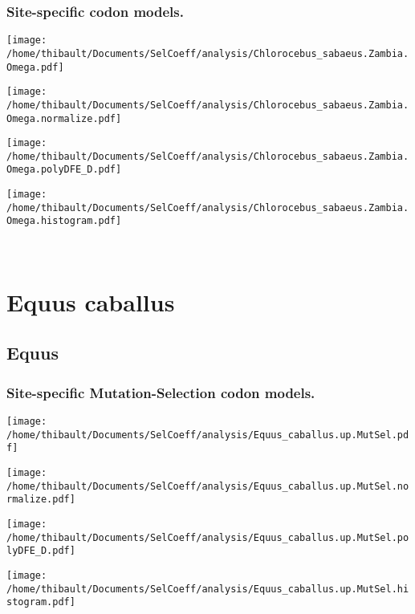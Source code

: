\subsubsection*{Site-specific codon models.} 
\begin{minipage}{0.49\linewidth} 
\texttt{[image: /home/thibault/Documents/SelCoeff/analysis/Chlorocebus\_sabaeus.Zambia.Omega.pdf]} 
\end{minipage}
\begin{minipage}{0.49\linewidth} 
\texttt{[image: /home/thibault/Documents/SelCoeff/analysis/Chlorocebus\_sabaeus.Zambia.Omega.normalize.pdf]} 
\end{minipage}
\begin{minipage}{0.49\linewidth} 
\texttt{[image: /home/thibault/Documents/SelCoeff/analysis/Chlorocebus\_sabaeus.Zambia.Omega.polyDFE\_D.pdf]} 
\end{minipage}
\begin{minipage}{0.49\linewidth} 
\texttt{[image: /home/thibault/Documents/SelCoeff/analysis/Chlorocebus\_sabaeus.Zambia.Omega.histogram.pdf]} 
\end{minipage}
\\ 
\section{Equus caballus} 
 
\subsection{Equus} 
 
\subsubsection*{Site-specific Mutation-Selection codon models.} 
\begin{minipage}{0.49\linewidth} 
\texttt{[image: /home/thibault/Documents/SelCoeff/analysis/Equus\_caballus.up.MutSel.pdf]} 
\end{minipage}
\begin{minipage}{0.49\linewidth} 
\texttt{[image: /home/thibault/Documents/SelCoeff/analysis/Equus\_caballus.up.MutSel.normalize.pdf]} 
\end{minipage}
\begin{minipage}{0.49\linewidth} 
\texttt{[image: /home/thibault/Documents/SelCoeff/analysis/Equus\_caballus.up.MutSel.polyDFE\_D.pdf]} 
\end{minipage}
\begin{minipage}{0.49\linewidth} 
\texttt{[image: /home/thibault/Documents/SelCoeff/analysis/Equus\_caballus.up.MutSel.histogram.pdf]} 
\end{minipage}
\\ 
